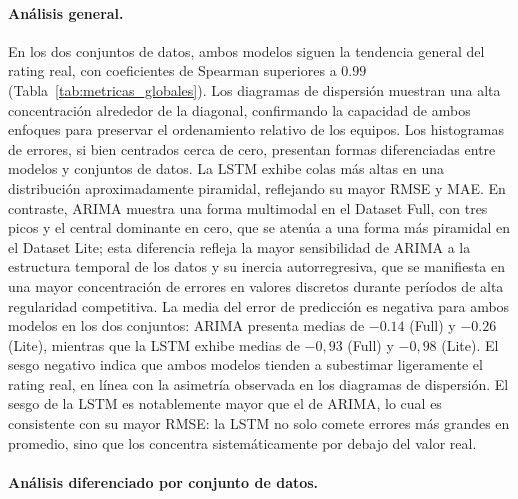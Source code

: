 \paragraph{An\'alisis general.}
En los dos conjuntos de datos, ambos modelos siguen la tendencia general del rating real, con coeficientes de Spearman superiores a \(0.99\) (Tabla~\ref{tab:metricas_globales}). Los diagramas de dispersi\'on muestran una alta concentraci\'on alrededor de la diagonal, confirmando la capacidad de ambos enfoques para preservar el ordenamiento relativo de los equipos. Los histogramas de errores, si bien centrados cerca de cero, presentan formas diferenciadas entre modelos y conjuntos de datos. La LSTM exhibe colas m\'as altas en una distribuci\'on aproximadamente piramidal, reflejando su mayor RMSE y MAE. En contraste, ARIMA muestra una forma multimodal en el Dataset Full, con tres picos y el central dominante en cero, que se aten\'ua a una forma m\'as piramidal en el Dataset Lite; esta diferencia refleja la mayor sensibilidad de ARIMA a la estructura temporal de los datos y su inercia autorregresiva, que se manifiesta en una mayor concentraci\'on de errores en valores discretos durante per\'iodos de alta regularidad competitiva. La media del error de predicci\'on es negativa para ambos modelos en los dos conjuntos: ARIMA presenta medias de $-0{.}14$ (Full) y $-0{.}26$ (Lite), mientras que la LSTM exhibe medias de $-0{,}93$ (Full) y $-0{,}98$ (Lite). El sesgo negativo indica que ambos modelos tienden a subestimar ligeramente el rating real, en l\'inea con la asimetr\'ia observada en los diagramas de dispersi\'on. El sesgo de la LSTM es notablemente mayor que el de ARIMA, lo cual es consistente con su mayor RMSE: la LSTM no solo comete errores m\'as grandes en promedio, sino que los concentra sistem\'aticamente por debajo del valor real.

\paragraph{An\'alisis diferenciado por conjunto de datos.}

